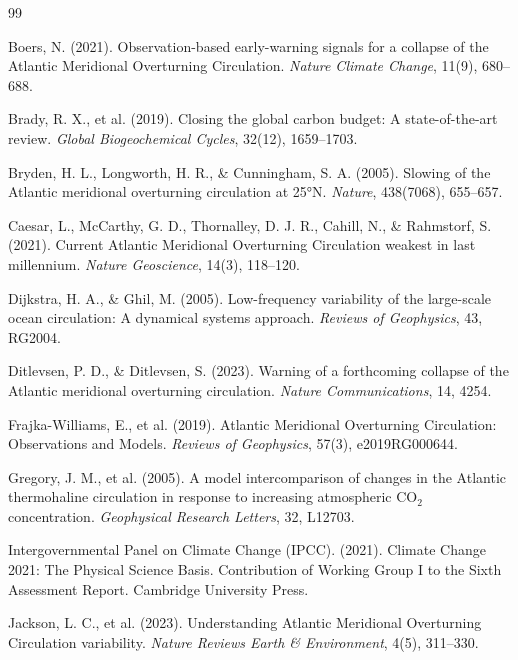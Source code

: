 \documentclass[12pt,letterpaper]{article}
\begin{document}
\begin{thebibliography}{99}

 Boers, N. (2021). Observation-based early-warning signals for a collapse of the Atlantic Meridional Overturning Circulation. \textit{Nature Climate Change}, 11(9), 680--688.

 Brady, R. X., et al. (2019). Closing the global carbon budget: A state-of-the-art review. \textit{Global Biogeochemical Cycles}, 32(12), 1659--1703.

 Bryden, H. L., Longworth, H. R., \& Cunningham, S. A. (2005). Slowing of the Atlantic meridional overturning circulation at 25°N. \textit{Nature}, 438(7068), 655--657.

 Caesar, L., McCarthy, G. D., Thornalley, D. J. R., Cahill, N., \& Rahmstorf, S. (2021). Current Atlantic Meridional Overturning Circulation weakest in last millennium. \textit{Nature Geoscience}, 14(3), 118--120.

 Dijkstra, H. A., \& Ghil, M. (2005). Low-frequency variability of the large-scale ocean circulation: A dynamical systems approach. \textit{Reviews of Geophysics}, 43, RG2004.

 Ditlevsen, P. D., \& Ditlevsen, S. (2023). Warning of a forthcoming collapse of the Atlantic meridional overturning circulation. \textit{Nature Communications}, 14, 4254.

 Frajka-Williams, E., et al. (2019). Atlantic Meridional Overturning Circulation: Observations and Models. \textit{Reviews of Geophysics}, 57(3), e2019RG000644.

 Gregory, J. M., et al. (2005). A model intercomparison of changes in the Atlantic thermohaline circulation in response to increasing atmospheric CO$_2$ concentration. \textit{Geophysical Research Letters}, 32, L12703.

 Intergovernmental Panel on Climate Change (IPCC). (2021). Climate Change 2021: The Physical Science Basis. Contribution of Working Group I to the Sixth Assessment Report. Cambridge University Press.

 Jackson, L. C., et al. (2023). Understanding Atlantic Meridional Overturning Circulation variability. \textit{Nature Reviews Earth \& Environment}, 4(5), 311--330.


\end{thebibliography}
\end{document}
